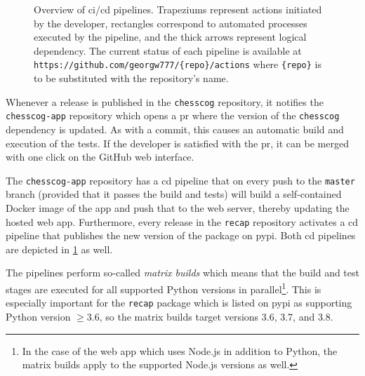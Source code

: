 \documentclass[../report.tex]{subfiles}
\begin{document}
\begin{figure}
{
    }
    \caption[Overview of \acs{ci}/\acs{cd} pipelines.]{Overview of \acs{ci}/\acs{cd} pipelines. Trapeziums represent actions initiated by the developer, rectangles correspond to automated processes executed by the pipeline, and the thick arrows represent logical dependency. The current status of each pipeline is available at \texttt{https://github.com/georgw777/\{repo\}/actions} where \texttt{\{repo\}} is to be substituted with the repository’s name.}
    \label{fig:cicd}
\end{figure}
Whenever a release is published in the \texttt{chesscog} repository, it notifies the \texttt{chesscog-app} repository which opens a \gls{pr} where the version of the \texttt{chesscog} dependency is updated.
As with a commit, this causes an automatic build and execution of the tests.
If the developer is satisfied with the \gls{pr}, it can be merged with one click on the GitHub web interface.

The \texttt{chesscog-app} repository has a \gls{cd} pipeline that on every push to the \texttt{master} branch (provided that it passes the build and tests) will build a self-contained Docker image of the app and push that to the web server, thereby updating the hosted web app.
Furthermore, every release in the \texttt{recap} repository activates a \gls{cd} pipeline that publishes the new version of the package on \gls{pypi}.
Both \gls{cd} pipelines are depicted in \cref{fig:cicd} as well.

The pipelines perform so-called \emph{matrix builds} which means that the build and test stages are executed for all supported Python versions in parallel\footnote{In the case of the web app which uses Node.js in addition to Python, the matrix builds apply to the supported Node.js versions as well.}.
This is especially important for the \texttt{recap} package which is listed on \gls{pypi} as supporting Python version $\geq 3.6$, so the matrix builds target versions 3.6, 3.7, and 3.8.
\end{document}
